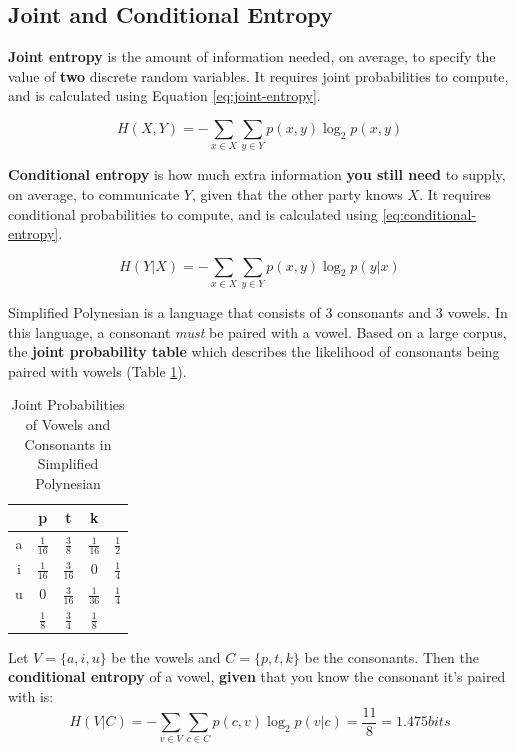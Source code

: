 \documentclass{article}
\begin{document}
\subsection{Joint and Conditional Entropy} 

\textbf{Joint entropy} is the amount of information needed, on average, to specify the value of \textbf{two} discrete random variables. It requires joint probabilities to compute, and is calculated using Equation \ref{eq:joint-entropy}.

\begin{equation}
	H(X, Y) = - \sum_{x \in X} { \sum_{y \in Y} {
		p(x, y) \log_2 p(x, y)
	} }
	\label{eq:joint-entropy}
\end{equation}

\textbf{Conditional entropy} is how much extra information \textbf{you still need} to supply, on average, to communicate $Y$, given that the other party knows $X$. It requires conditional probabilities to compute, and is calculated using \ref{eq:conditional-entropy}.

\begin{equation}
	H(Y|X) = - \sum_{x \in X} { \sum_{y \in Y} {
		p(x, y) \log_2 p(y|x)
	} }
	\label{eq:conditional-entropy}
\end{equation}

Simplified Polynesian is a language that consists of 3 consonants and 3 vowels. In this language, a consonant \textit{must} be paired with a vowel. Based on a large corpus, the \textbf{joint probability table} which describes the likelihood of consonants being paired with vowels (Table \ref{tab:joint-entropy-example}).

\begin{table}
	\centering
	\begin{tabular}{c|c|c|c|c}
		& p & t & k \\
		\hline
		a & $\frac{1}{16}$ & $\frac{3}{8}$ & $\frac{1}{16}$ & $\frac{1}{2}$ \\
		i & $\frac{1}{16}$ & $\frac{3}{16}$ & 0 & $\frac{1}{4}$ \\
		u & 0 & $\frac{3}{16}$ & $\frac{1}{36}$ & $\frac{1}{4}$ \\
		\hline		
		& $\frac{1}{8}$ & $\frac{3}{4}$ & $\frac{1}{8}$ & \\
	\end{tabular}
	\caption{Joint Probabilities of Vowels and Consonants in Simplified Polynesian}
	\label{tab:joint-entropy-example}
\end{table}

Let $V = \lbrace a, i, u \rbrace$ be the vowels and $C = \lbrace p, t, k \rbrace$ be the consonants. Then the \textbf{conditional entropy} of a vowel, \textbf{given} that you know the consonant it's paired with is:
\begin{equation}
	H(V|C) = - \sum_{v \in V} { \sum_{c \in C} {
		p(c, v) \log_2 p(v|c) } } = \frac{11}{8} = 1.475 bits
\end{equation}
\end{document}
